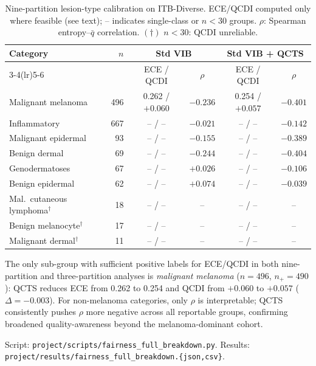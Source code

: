 \documentclass{bmvc2k}
\newcommand{\qbar}{\bar{q}}
\begin{document}
\begin{table}[h]
\centering
\caption{Nine-partition lesion-type calibration on ITB-Diverse.
  ECE/QCDI computed only where feasible (see text); -- indicates
  single-class or $n{<}30$ groups. $\rho$: Spearman entropy--$\qbar$
  correlation. $(\dagger)$ $n{<}30$: QCDI unreliable.}
\label{tab:fairness_nine}
\footnotesize
\begin{tabular}{lrcccc}
\toprule
Category & $n$ & \multicolumn{2}{c}{Std VIB} & \multicolumn{2}{c}{Std VIB + QCTS} \\
\cmidrule(lr){3-4}\cmidrule(lr){5-6}
& & ECE / QCDI & $\rho$ & ECE / QCDI & $\rho$ \\
\midrule
Malignant melanoma     & 496 & 0.262 / $+0.060$ & $-0.236$ & 0.254 / $+0.057$ & $-0.401$ \\
Inflammatory           & 667 & -- / --           & $-0.021$ & -- / --           & $-0.142$ \\
Malignant epidermal    &  93 & -- / --           & $-0.155$ & -- / --           & $-0.389$ \\
Benign dermal          &  69 & -- / --           & $-0.244$ & -- / --           & $-0.404$ \\
Genodermatoses         &  67 & -- / --           & $+0.026$ & -- / --           & $-0.106$ \\
Benign epidermal       &  62 & -- / --           & $+0.074$ & -- / --           & $-0.039$ \\
Mal.\ cutaneous lymphoma$^{\dagger}$ & 18 & -- / -- & -- & -- / -- & -- \\
Benign melanocyte$^{\dagger}$ & 17 & -- / -- & -- & -- / -- & -- \\
Malignant dermal$^{\dagger}$ & 11 & -- / -- & -- & -- / -- & -- \\
\bottomrule
\end{tabular}
\end{table}

The only sub-group with sufficient positive labels for ECE/QCDI in both
nine-partition and three-partition analyses is \emph{malignant melanoma}
($n{=}496$, $n_+{=}490$): QCTS reduces ECE from 0.262 to 0.254 and QCDI
from $+0.060$ to $+0.057$ ($\Delta{=}{-}0.003$). For non-melanoma categories,
only $\rho$ is interpretable; QCTS consistently pushes $\rho$ more negative
across all reportable groups, confirming broadened quality-awareness beyond
the melanoma-dominant cohort.

Script: \texttt{project/scripts/fairness\_full\_breakdown.py}.
Results: \texttt{project/results/fairness\_full\_breakdown.\{json,csv\}}.
\end{document}

